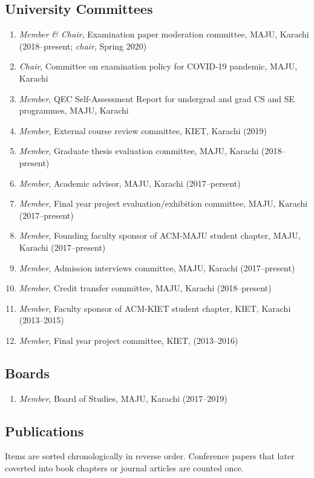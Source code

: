 \documentclass[a4paper, 10pt]{article}
\begin{document}
\subsection*{\textcolor{NavyBlue}{University Committees}}
\begin{enumerate}
\itemsep = 0em
\item \emph{Member \& Chair}, Examination paper moderation committee, MAJU, Karachi (2018--present; \emph{chair}, Spring 2020)
\item \emph{ Chair}, Committee on examination policy for COVID-19 pandemic, MAJU, Karachi
\item \emph{ Member}, QEC Self-Assessment Report for undergrad and grad CS and SE programmes, MAJU, Karachi
\item \emph{ Member}, External course review committee, KIET, Karachi (2019)
\item \emph{ Member}, Graduate thesis evaluation committee, MAJU, Karachi (2018--present)
\item \emph{ Member}, Academic advisor, MAJU, Karachi (2017--persent)
\item\emph{ Member}, Final year project evaluation/exhibition committee, MAJU, Karachi (2017--present)
\item \emph{ Member}, Founding faculty sponsor of ACM-MAJU student chapter, MAJU, Karachi (2017--present)
\item \emph{ Member}, Admission interviews committee, MAJU, Karachi (2017--present)
\item \emph{ Member}, Credit transfer committee, MAJU, Karachi (2018--present)
\item \emph{ Member}, Faculty sponsor of ACM-KIET student chapter, KIET, Karachi (2013--2015)
\item \emph{ Member}, Final year project committee, KIET, (2013--2016)
\end{enumerate}

\subsection*{\textcolor{NavyBlue}{Boards}}
\begin{enumerate}
\itemsep = 0em
\item \emph{ Member}, Board of Studies, MAJU, Karachi (2017--2019)
\end{enumerate}

\subsection*{\textcolor{NavyBlue}{Publications}}
\label{publications}
Items are sorted chronologically in reverse order. Conference papers that later coverted into book chapters or journal articles are counted once.
\end{document}
